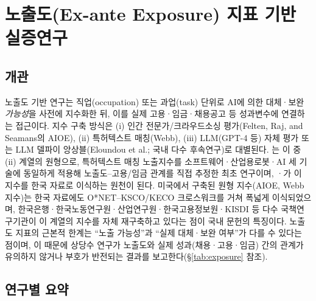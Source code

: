 \documentclass[11pt]{article}
\begin{document}
\section{노출도(Ex-ante Exposure) 지표 기반 실증연구}
\label{sec:exposure}

\subsection{개관}

노출도 기반 연구는 직업(occupation) 또는 과업(task) 단위로 AI에 의한 대체·보완 \emph{가능성}을 사전에 지수화한 뒤, 이를 실제 고용·임금·채용공고 등 성과변수에 연결하는 접근이다. 지수 구축 방식은 (i) 인간 전문가/크라우드소싱 평가(Felten, Raj, and Seamans의 AIOE), (ii) 특허텍스트 매칭(Webb), (iii) LLM(GPT-4 등) 자체 평가 또는 LLM 델파이 앙상블(Eloundou et al.; 국내 다수 후속연구)로 대별된다. \citet{webb-2020-impact-artificial-intelligence-labor}는 이 중 (ii) 계열의 원형으로, 특허텍스트 매칭 노출지수를 소프트웨어·산업용로봇·AI 세 기술에 동일하게 적용해 노출도--고용/임금 관계를 직접 추정한 최초 연구이며, \citet{han-2023-ai-and-labor-market-change}·\citet{kiet-2024-ai-labor-market-industry}가 이 지수를 한국 자료로 이식하는 원천이 된다. 미국에서 구축된 원형 지수(AIOE, Webb 지수)는 한국 자료에도 O*NET--KSCO/KECO 크로스워크를 거쳐 폭넓게 이식되었으며, 한국은행·한국노동연구원·산업연구원·한국고용정보원·KISDI 등 다수 국책연구기관이 이 계열의 지수를 자체 재구축하고 있다는 점이 국내 문헌의 특징이다. 노출도 지표의 근본적 한계는 ``노출 가능성''과 ``실제 대체·보완 여부''가 다를 수 있다는 점이며, 이 때문에 상당수 연구가 노출도와 실제 성과(채용·고용·임금) 간의 관계가 유의하지 않거나 부호가 반전되는 결과를 보고한다(\S\ref{tab:exposure} 참조).

\subsection{연구별 요약}
\end{document}
